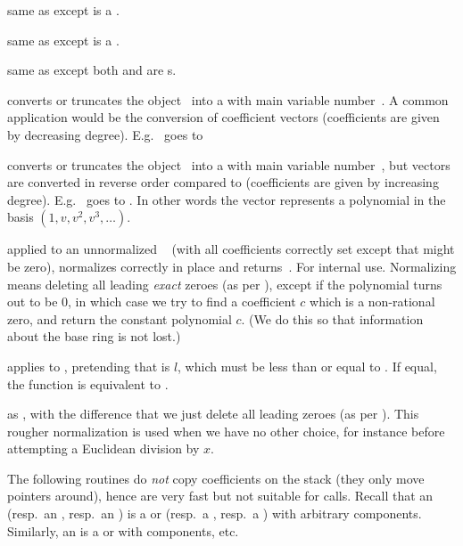  same as  except  is a
.

 same as  except  is a
.

 same as  except both
 and  are s.


 converts or truncates the object~
into a  with main variable number~. A common application
would be the conversion of coefficient vectors (coefficients are given by
decreasing degree). E.g.~\kbd{[2,3]} goes to 

 converts or truncates the object~
into a  with main variable number~, but vectors are converted
in reverse order compared to  (coefficients are given by
increasing degree). E.g.~\kbd{[2,3]} goes to . In other words
the vector represents a polynomial in the basis $(1,v,v^2,v^3,\dots)$.

 applied to an unnormalized ~
(with all coefficients correctly set except that  might
be zero), normalizes  correctly in place and returns~. For
internal use. Normalizing means deleting all leading \emph{exact} zeroes
(as per ), except if the polynomial turns out to be $0$,
in which case we try to find a coefficient $c$ which is a non-rational zero,
and return the constant polynomial $c$. (We do this so that information
about the base ring is not lost.)

 applies  to
, pretending that  is $l$, which must be less than
or equal to . If equal, the function is equivalent to
.

 as ,
with the difference that we just delete all leading zeroes (as per
). This rougher normalization is used when we have no other
choice, for instance before attempting a Euclidean division by $x$.

The following routines do \emph{not} copy coefficients on the stack (they
only move pointers around), hence are very fast but not suitable for
 calls. Recall that an  (resp.~an , resp.~an
) is a  or  (resp.~a , resp.~a )
with arbitrary components. Similarly, an  is a  or
 with  components, etc.

